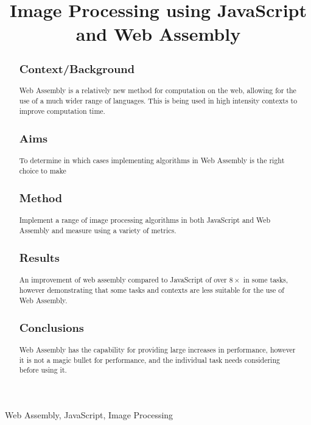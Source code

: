 \documentclass[12pt,a4paper]{article}
\title{Image Processing using JavaScript and Web Assembly}
\author{} %
\date{}
\begin{document}
\maketitle

\begin{abstract}
    \subsection{Context/Background}
    Web Assembly is a relatively new method for computation on the web, allowing for the use of a much wider range of languages. This is being used in high intensity contexts to improve computation time.

    \subsection{Aims}

    To determine in which cases implementing algorithms in Web Assembly is the right choice to make

    \subsection{Method}

    Implement a range of image processing algorithms in both JavaScript and Web Assembly and measure using a variety of metrics.

    \subsection{Results}

    An improvement of web assembly compared to JavaScript of over $8\times$ in some tasks, however demonstrating that some tasks and contexts are less suitable for the use of Web Assembly.

    \subsection{Conclusions}

    Web Assembly has the capability for providing large increases in performance, however it is not a magic bullet for performance, and the individual task needs considering before using it.
\end{abstract}

\begin{keywords}
    Web Assembly, JavaScript, Image Processing
\end{keywords}
\end{document}
